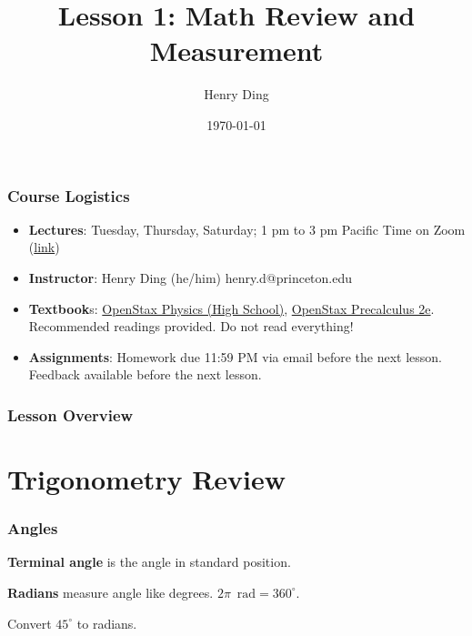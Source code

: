 \documentclass[20pt]{beamer}
\author{Henry Ding}
\date{\today}
\title{Lesson 1: Math Review and Measurement}
\begin{document}
\begin{frame}
	\frametitle{Course Logistics}
	\begin{itemize}
		\item \textbf{Lectures}: Tuesday, Thursday, Saturday; 1 pm to 3 pm Pacific Time on Zoom (\href{https://us06web.zoom.us/j/84225321342}{link})
		\item \textbf{Instructor}: Henry Ding (he/him) henry.d@princeton.edu
		\item \textbf{Textbook}s: \href{https://openstax.org/details/books/physics}{OpenStax Physics (High School)}, \href{https://openstax.org/details/books/precalculus-2e}{OpenStax Precalculus 2e}. Recommended readings provided. Do not read everything!
		\item \textbf{Assignments}: Homework due 11:59 PM via email before the next lesson. Feedback available before the next lesson.
	\end{itemize}
\end{frame}

\begin{frame}
	\frametitle{Lesson Overview}
	\tableofcontents
\end{frame}

\section{Trigonometry Review}
\begin{frame}
	\frametitle{Angles \footnotemark}
	\begin{figure}[ht]
		\centering
		\label{fig:angle}
	\end{figure}
	\begin{definition}
		\textbf{Terminal angle} is the angle in standard position.
	\end{definition}
	\begin{definition}
		\textbf{Radians} measure angle like degrees. $2\pi\;\SI{}{\radian}= 360^\mathrm{\circ}$.
	\end{definition}
	\begin{example}
		Convert $45^\mathrm{\circ}$ to radians.
	\end{example}
\end{frame}
\end{document}
